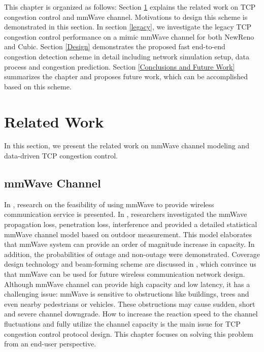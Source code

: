 \par This chapter is organized as follows: Section \ref{Related Work and Motivations} explains the related work on TCP congestion control and mmWave channel. Motivations to design this scheme is demonstrated in this section. In section \ref{legacy}, we investigate the legacy TCP congestion control performance on a mimic mmWave channel for both NewReno and Cubic. Section \ref{Design} demonstrates the proposed fast end-to-end congestion detection scheme in detail including network simulation setup, data process and congestion prediction. Section \ref{Conclusions and Future Work} summarizes the chapter and proposes future work, which can be accomplished based on this scheme.

\section{Related Work}
\label{Related Work and Motivations}
In this section, we present the related work on mmWave channel modeling and data-driven TCP congestion control.  
\subsection{mmWave Channel}
\par In \cite{niu2015survey}\cite{rappaport2013millimeter}, research on the feasibility of using mmWave to provide wireless communication service is presented. In \cite{akdeniz2014millimeter}, researchers investigated the mmWave propagation loss, penetration loss, interference and provided a detailed statistical mmWave channel model based on outdoor measurement. This model elaborates that mmWave system can provide an order of magnitude increase in capacity. In addition, the probabilities of outage and non-outage were demonstrated. Coverage design technology and beam-forming scheme are discussed in\cite{sun2014millimeter} \cite{roh2014millimeter}, which convince us that mmWave can be used for future wireless communication network design. Although mmWave channel can provide high capacity and low latency, it has a challenging issue: mmWave is sensitive to obstructions like buildings, trees and even nearby pedestrians or vehicles. These obstructions may cause sudden, short and severe channel downgrade. How to increase the reaction speed to the channel fluctuations and fully utilize the channel capacity is the main issue for TCP congestion control protocol design. This chapter focuses on solving this problem from an end-user perspective.

